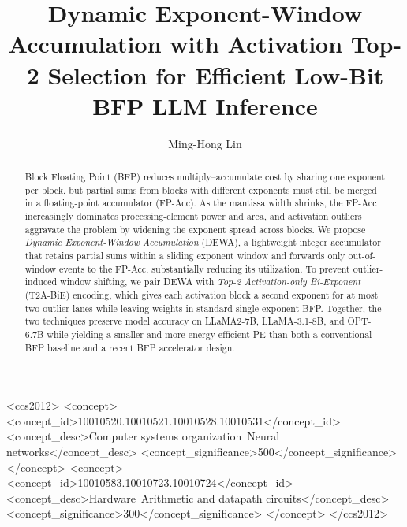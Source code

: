 \documentclass[sigconf,nonacm]{acmart}
\title[DEWA with Activation Top-2 Selection]{Dynamic Exponent-Window Accumulation with Activation Top-2 Selection for Efficient Low-Bit BFP LLM Inference}
\author{Ming-Hong Lin}
\affiliation{%
  \institution{National Taiwan University of Science and Technology}
  \department{Department of Electrical Engineering}
  \city{Taipei}
  \country{Taiwan}}
\begin{document}
\begin{abstract}
Block Floating Point (BFP) reduces multiply--accumulate cost by sharing one exponent per block, but partial sums from blocks with different exponents must still be merged in a floating-point accumulator (FP-Acc).
As the mantissa width shrinks, the FP-Acc increasingly dominates processing-element power and area, and activation outliers aggravate the problem by widening the exponent spread across blocks.
We propose \emph{Dynamic Exponent-Window Accumulation} (DEWA), a lightweight integer accumulator that retains partial sums within a sliding exponent window and forwards only out-of-window events to the FP-Acc, substantially reducing its utilization.
To prevent outlier-induced window shifting, we pair DEWA with \emph{Top-2 Activation-only Bi-Exponent} (T2A-BiE) encoding, which gives each activation block a second exponent for at most two outlier lanes while leaving weights in standard single-exponent BFP.
Together, the two techniques preserve model accuracy on LLaMA2-7B, LLaMA-3.1-8B, and OPT-6.7B while yielding a smaller and more energy-efficient PE than both a conventional BFP baseline and a recent BFP accelerator design.
\end{abstract}

\begin{CCSXML}
<ccs2012> 
 <concept>
  <concept_id>10010520.10010521.10010528.10010531</concept_id>
  <concept_desc>Computer systems organization~Neural networks</concept_desc>
  <concept_significance>500</concept_significance>
 </concept>
 <concept>
  <concept_id>10010583.10010723.10010724</concept_id>
  <concept_desc>Hardware~Arithmetic and datapath circuits</concept_desc>
  <concept_significance>300</concept_significance>
 </concept> 
</ccs2012>
\end{CCSXML}



\maketitle










\end{document}
